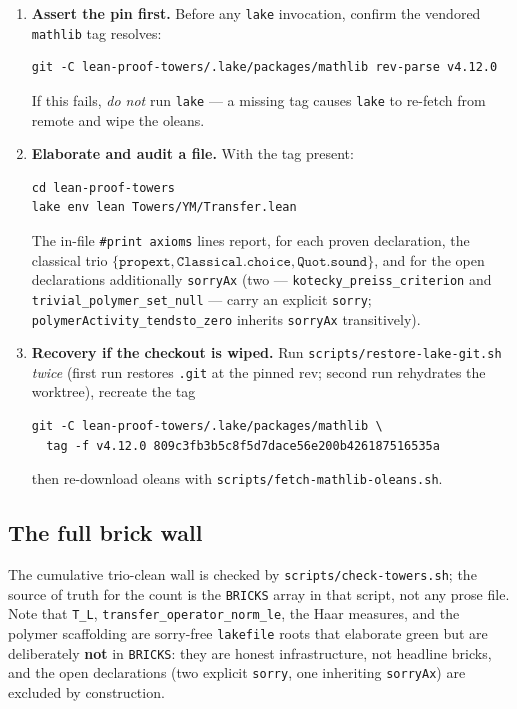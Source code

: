 \documentclass[11pt]{article}
\newcommand{\code}[1]{\texttt{#1}}
\begin{document}
\begin{enumerate}
  \item \textbf{Assert the pin first.} Before any \code{lake}
        invocation, confirm the vendored \code{mathlib} tag resolves:
        \begin{verbatim}
git -C lean-proof-towers/.lake/packages/mathlib rev-parse v4.12.0
        \end{verbatim}
        If this fails, \emph{do not} run \code{lake} --- a missing tag
        causes \code{lake} to re-fetch from remote and wipe the
        oleans.
  \item \textbf{Elaborate and audit a file.} With the tag present:
        \begin{verbatim}
cd lean-proof-towers
lake env lean Towers/YM/Transfer.lean
        \end{verbatim}
        The in-file \code{\#print axioms} lines report, for each
        proven declaration, the classical trio
        $\{\code{propext},\code{Classical.choice},\code{Quot.sound}\}$,
        and for the open declarations additionally \code{sorryAx} (two
        --- \code{kotecky\_preiss\_criterion} and
        \code{trivial\_polymer\_set\_null} --- carry an explicit
        \code{sorry}; \code{polymerActivity\_tendsto\_zero} inherits
        \code{sorryAx} transitively).
  \item \textbf{Recovery if the checkout is wiped.} Run
        \code{scripts/restore-lake-git.sh} \emph{twice} (first run
        restores \code{.git} at the pinned rev; second run rehydrates
        the worktree), recreate the tag
        \begin{verbatim}
git -C lean-proof-towers/.lake/packages/mathlib \
  tag -f v4.12.0 809c3fb3b5c8f5d7dace56e200b426187516535a
        \end{verbatim}
        then re-download oleans with
        \code{scripts/fetch-mathlib-oleans.sh}.
\end{enumerate}

\subsection{The full brick wall}

The cumulative trio-clean wall is checked by
\code{scripts/check-towers.sh}; the source of truth for the count is
the \code{BRICKS} array in that script, not any prose file. Note that
\code{T\_L}, \code{transfer\_operator\_norm\_le}, the Haar measures,
and the polymer scaffolding are sorry-free \code{lakefile} roots that
elaborate green but are deliberately \textbf{not} in \code{BRICKS}:
they are honest infrastructure, not headline bricks, and the open
declarations (two explicit \code{sorry}, one inheriting
\code{sorryAx}) are excluded by construction.
\end{document}
